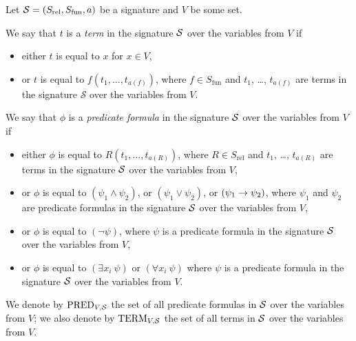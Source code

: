 \begin{definition}
  Let $\mathcal{S} = (S_\mathrm{rel}, S_\mathrm{fun}, a)$ be a signature and $V$
  be some set.

  We say that $t$ is a \emph{term} in the signature $\mathcal{S}$ over the variables
  from $V$ if
  \begin{itemize}
    \item either $t$ is equal to $x$ for $x \in V$,
    \item or $t$ is equal to $f(t_1, \dots, t_{a(f)})$, where
      $f \in S_\mathrm{fun}$ and $t_1$, \dots, $t_{a(f)}$ are terms in the
      signature $\mathcal{S}$ over the variables from $V$.
  \end{itemize}

  We say that $\phi$ is a \emph{predicate formula} in the signature
  $\mathcal{S}$ over the variables from $V$ if
  \begin{itemize}
    \item either $\phi$ is equal to $R(t_1, \dots, t_{a(R)})$, where
      $R \in S_\mathrm{rel}$ and $t_1$, \dots, $t_{a(R)}$ are terms in the
      signature $\mathcal{S}$ over the variables from $V$,
    \item or $\phi$ is equal to $(\psi_1 \land \psi_2)$, or
      $(\psi_1 \lor \psi_2)$, or $(\psi_1 \rightarrow \psi_2)$, where $\psi_1$ and
      $\psi_2$ are predicate formulas in the signature $\mathcal{S}$ over the
      variables from $V$,
    \item or $\phi$ is equal to $(\lnot \psi)$, where $\psi$ is a predicate
      formula in the signature $\mathcal{S}$ over the variables from $V$,
    \item or $\phi$ is equal to $\left( \exists x_i~\psi \right)$ or 
      $\left( \forall x_i~\psi \right)$ where
      $\psi$ is a predicate formula in the signature $\mathcal{S}$ over the
      variables from $V$.
  \end{itemize}

  We denote by $\mathrm{PRED}_{{V}, {\mathcal{S}}}$ the set of all predicate formulas in
  $\mathcal{S}$ over the variables from $V$; we also denote by
  $\mathrm{TERM}_{{V}, {\mathcal{S}}}$ the set of all terms in $\mathcal{S}$ over the
  variables from $V$.
\end{definition}

